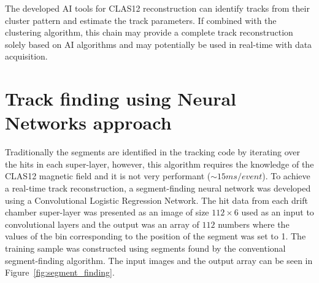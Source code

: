 \documentclass[a4paper,11pt]{article}
\begin{document}
The developed AI tools for CLAS12 reconstruction can identify tracks from their cluster pattern and estimate the track parameters.
If combined with the clustering algorithm, this chain may provide a complete track reconstruction solely based on AI algorithms and
may potentially be used in real-time with data acquisition. 

\section{Track finding using Neural Networks approach}

Traditionally the segments are identified in the tracking code by iterating over the hits in each super-layer, however, this algorithm requires the knowledge of the CLAS12 magnetic field and it is not very performant ($\sim 15 ms/event$). To achieve a real-time track reconstruction, a segment-finding neural network was developed using a Convolutional Logistic Regression Network.
The hit data from each drift chamber super-layer was presented as an image of size $112\times6$ used as an input to convolutional layers and the output was an array of $112$ numbers where the values of the bin corresponding to the position of the segment was set to 1.  The training sample was constructed using segments found by the conventional segment-finding algorithm. The input images and the output array can be seen in Figure~\ref{fig:segment_finding}. 
\end{document}
